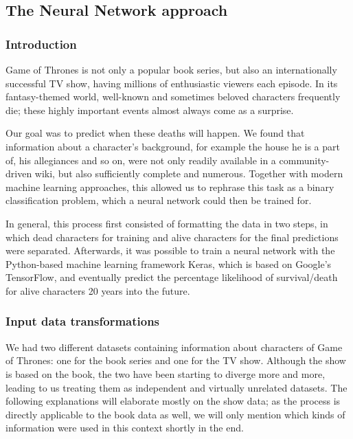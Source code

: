 \documentclass{bioinfo}
\begin{document}
\subsection{The Neural Network approach}

\subsubsection{Introduction}

Game of Thrones is not only a popular book series, but also an internationally successful TV show, having millions of enthusiastic viewers each episode. In its fantasy-themed world, well-known and sometimes beloved characters frequently die; these highly important events almost always come as a surprise.

Our goal was to predict when these deaths will happen. We found that information about a character's background, for example the house he is a part of, his allegiances and so on, were not only readily available in a community-driven wiki, but also sufficiently complete and numerous. Together with modern machine learning approaches, this allowed us to rephrase this task as a binary classification problem, which a neural network could then be trained for.

In general, this process first consisted of formatting the data in two steps, in which dead characters for training and alive characters for the final predictions were separated. Afterwards, it was possible to train a neural network with the Python-based machine learning framework Keras, which is based on Google's TensorFlow, and eventually predict the percentage likelihood of survival/death for alive characters 20 years into the future.

\subsubsection{Input data transformations}

We had two different datasets containing information about characters of Game of Thrones: one for the book series and one for the TV show. Although the show is based on the book, the two have been starting to diverge more and more, leading to us treating them as independent and virtually unrelated datasets. The following explanations will elaborate mostly on the show data; as the process is directly applicable to the book data as well, we will only mention which kinds of information were used in this context shortly in the end.
\end{document}
